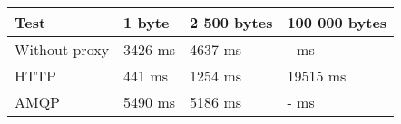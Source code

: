 \begin{tabularx}{\textwidth}{llll}
\hline
 Test          & 1 byte   & 2 500 bytes   & 100 000 bytes   \\
\hline
 Without proxy & 3426 ms  & 4637 ms       & - ms            \\
 HTTP          & 441 ms   & 1254 ms       & 19515 ms        \\
 AMQP          & 5490 ms  & 5186 ms       & - ms            \\
\hline
\end{tabularx}